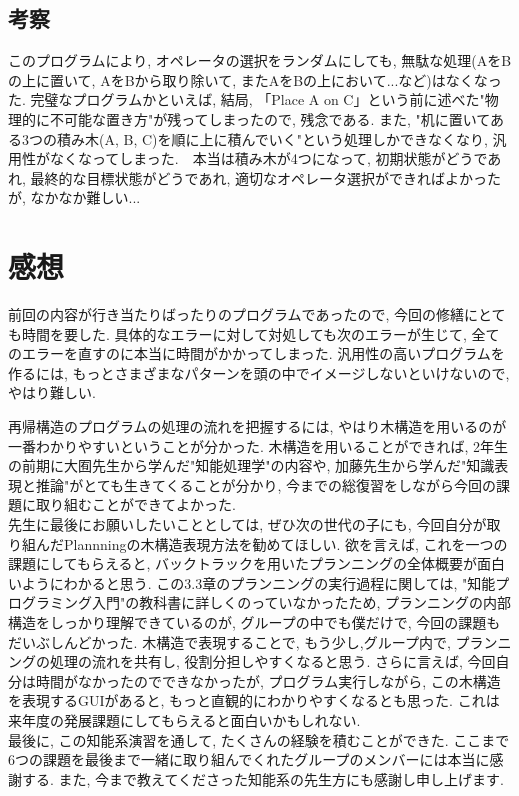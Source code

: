 \documentclass[uplatex,12pt]{jsarticle}
\begin{document}
\subsection{考察}
このプログラムにより, オペレータの選択をランダムにしても, 無駄な処理(AをBの上に置いて, AをBから取り除いて, またAをBの上において...など)はなくなった. 完璧なプログラムかといえば, 結局, 「Place A on C」という前に述べた"物理的に不可能な置き方"が残ってしまったので, 残念である. また, "机に置いてある3つの積み木(A, B, C)を順に上に積んでいく"という処理しかできなくなり, 汎用性がなくなってしまった.　本当は積み木が4つになって, 初期状態がどうであれ, 最終的な目標状態がどうであれ, 適切なオペレータ選択ができればよかったが, なかなか難しい...

\section{感想}
前回の内容が行き当たりばったりのプログラムであったので, 今回の修繕にとても時間を要した. 具体的なエラーに対して対処しても次のエラーが生じて, 全てのエラーを直すのに本当に時間がかかってしまった. 汎用性の高いプログラムを作るには, もっとさまざまなパターンを頭の中でイメージしないといけないので, やはり難しい.

再帰構造のプログラムの処理の流れを把握するには, やはり木構造を用いるのが一番わかりやすいということが分かった. 木構造を用いることができれば, 2年生の前期に大囿先生から学んだ"知能処理学"の内容や, 加藤先生から学んだ"知識表現と推論"がとても生きてくることが分かり, 今までの総復習をしながら今回の課題に取り組むことができてよかった. \\
先生に最後にお願いしたいこととしては, ぜひ次の世代の子にも, 今回自分が取り組んだPlannningの木構造表現方法を勧めてほしい. 欲を言えば, これを一つの課題にしてもらえると, バックトラックを用いたプランニングの全体概要が面白いようにわかると思う. この3.3章のプランニングの実行過程に関しては, "知能プログラミング入門"の教科書に詳しくのっていなかったため, プランニングの内部構造をしっかり理解できているのが, グループの中でも僕だけで, 今回の課題もだいぶしんどかった. 木構造で表現することで, もう少し,グループ内で, プランニングの処理の流れを共有し, 役割分担しやすくなると思う. さらに言えば, 今回自分は時間がなかったのでできなかったが, プログラム実行しながら, この木構造を表現するGUIがあると, もっと直観的にわかりやすくなるとも思った. これは来年度の発展課題にしてもらえると面白いかもしれない.\\

最後に, この知能系演習を通して, たくさんの経験を積むことができた. ここまで6つの課題を最後まで一緒に取り組んでくれたグループのメンバーには本当に感謝する. また, 今まで教えてくださった知能系の先生方にも感謝し申し上げます.
\end{document}
